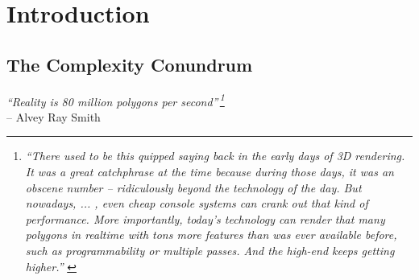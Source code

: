 \chapter{Introduction}
\label{introduction0}
\vspace{-0.25cm}
\section{The Complexity Conundrum}
\label{introduction1}

\begin{flushright}
\textit{``Reality is 80 million polygons per second''\,\footnote{ \textit{``There used to be this quipped saying back in the early days of 3D rendering. It was a great catchphrase at the time because during those days, it was an obscene number -- ridiculously beyond the technology of the day. But nowadays, ... , even cheap console systems can crank out that kind of performance. More importantly, today's technology can render that many polygons in realtime with tons more features than was ever available before, such as programmability or multiple passes. And the high-end keeps getting higher.''} \citep[John Carmack, co-founder of id Software, on that very quote, cited in:][]{Kosak2005}}}\\
-- Alvey Ray Smith \citep[co-founder Pixar, cited in:][p.168]{Rheingold1991}
\end{flushright}


